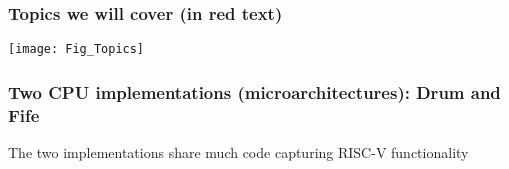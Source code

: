 
\begin{frame}
\frametitle{Topics we will cover (in red text)}

\footnotesize

\begin{center}
\texttt{[image: Fig\_Topics]}
\end{center}

\end{frame}


\begin{frame}
\frametitle{Two CPU implementations (microarchitectures): Drum and Fife}

\footnotesize

\begin{center}
\end{center}

The two implementations share much code capturing RISC-V functionality

\end{frame}


